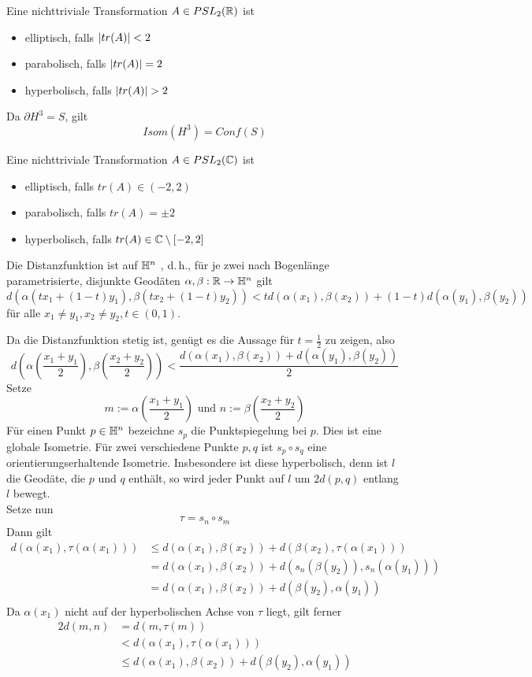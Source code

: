 \documentclass{book}
\begin{document}
\Prop{}
Eine nichttriviale Transformation $A \in PSL_2(\mathbb{R})$ ist
\begin{itemize}
	\item elliptisch, falls $\left|tr(A)\right| < 2$
	\item parabolisch, falls $\left|tr(A)\right| = 2$
	\item hyperbolisch, falls $\left|tr(A)\right| > 2$
\end{itemize}

\Prop{}
Da $\partial H^3 = S$, gilt
\[ Isom(H^3) = Conf(S) \]

\Prop{}
Eine nichttriviale Transformation $A \in PSL_2(\mathbb{C})$ ist
\begin{itemize}
	\item elliptisch, falls $tr(A) \in (-2, 2)$
	\item parabolisch, falls $tr(A) = \pm 2$
	\item hyperbolisch, falls $tr(A) \in \mathbb{C}\setminus [-2, 2]$
\end{itemize}

\Prop{}
Die Distanzfunktion ist auf $\mathbb{H}^n$ , d.\,h., für je zwei nach Bogenlänge parametrisierte, disjunkte Geodäten $\alpha, \beta : \mathbb{R} \overset{}{\rightarrow} \mathbb{H}^n$ gilt
\[ d(\alpha(t  x_1 + (1-t)  y_1), \beta(t  x_2 + (1-t)  y_2) ) < t  d(\alpha(x_1), \beta(x_2)) + (1-t)  d(\alpha(y_1), \beta(y_2) ) \]
für alle $x_1 \neq y_1, x_2 \neq y_2, t \in (0,1)$.
\begin{Beweis}{}
	Da die Distanzfunktion stetig ist, genügt es die Aussage für $t = \frac{1}{2}$ zu zeigen, also
	\[ d(\alpha(\frac{x_1 + y_1}{2}), \beta(\frac{x_2 + y_2}{2})) < \frac{d(\alpha(x_1), \beta(x_2) ) + d(\alpha(y_1), \beta(y_2))}{2}  \]
	Setze
	\[ m:= \alpha(\frac{x_1 + y_1}{2})  \text{ und }n:= \beta(\frac{x_2 + y_2}{2}) \]
	Für einen Punkt $p \in \mathbb{H}^n$ bezeichne $s_p$ die Punktspiegelung bei $p$. Dies ist eine globale Isometrie. Für zwei verschiedene Punkte $p,q$ ist $s_p \circ s_q$ eine orientierungserhaltende Isometrie. Insbesondere ist diese hyperbolisch, denn ist $l$ die Geodäte, die $p$ und $q$ enthält, so wird jeder Punkt auf $l$ um $2d(p,q)$ entlang $l$ bewegt.\\
	Setze nun
	\[ \tau = s_n \circ s_m \]
	Dann gilt
	\begin{align*}
	d(\alpha(x_1), \tau(\alpha(x_1)) ) & \leq d(\alpha(x_1), \beta(x_2) ) + d( \beta(x_2), \tau(\alpha(x_1)) )\\
	&=d(\alpha(x_1), \beta(x_2) ) + d(  s_n(\beta(y_2))  , s_n(\alpha(y_1))  )\\
		&=d(\alpha(x_1), \beta(x_2) ) + d(  \beta(y_2)  , \alpha(y_1)  )\\
	\end{align*}
	Da $\alpha(x_1)$ nicht auf der hyperbolischen Achse von $\tau$ liegt, gilt ferner
		\begin{align*}
2d(m,n) &= d(m, \tau(m))\\
&< d(\alpha(x_1), \tau(\alpha(x_1)))\\
&\leq d(\alpha(x_1), \beta(x_2) ) + d(  \beta(y_2)  , \alpha(y_1)  )
	\end{align*}
\end{Beweis}
\end{document}
